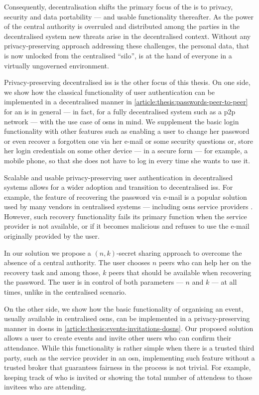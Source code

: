 Consequently, decentralisation shifts the primary focus of the \ac{is} 
to privacy, security and data portability --- and usable functionality thereafter. 
As the power of the central authority is overruled and distributed among the parties 
in the decentralised system new threats arise in the decentralised context. Without 
any privacy-preserving approach addressing these challenges, the personal data, 
that is now unlocked from the centralised ``silo'', is at the hand of everyone in 
a virtually ungoverned environment.

Privacy-preserving decentralised \acp{is} is the other focus of this thesis. On 
one side, we show how the classical functionality of user authentication can be 
implemented in a decentralised manner in \cref{article:thesis:passwords-peer-to-peer} 
for an \ac{is} in general --- in fact, for a fully decentralised system such as 
a \ac{p2p} network --- with the use case of \acp{osn} in mind. We supplement the 
basic login functionality with other features such as enabling a user to change 
her password or even recover a forgotten one via her e-mail or some security questions 
or, store her login credentials on some other device --- in a secure form --- for 
example, a mobile phone, so that she does not have to log in every time she wants 
to use it.

Scalable and usable privacy-preserving user authentication in decentralised systems 
allows for a wider adoption and transition to decentralised \acp{is}. 
For example, the feature of recovering the password via e-mail is a popular solution 
used by many vendors in centralised systems --- including \acp{osn} service providers 
\cite{Kuzma11}. However, such recovery functionality fails its primary function 
when the service provider is not available, or if it becomes malicious and refuses 
to use the e-mail originally provided by the user. 

In our solution we propose a \((n, k)\)-secret sharing approach to overcome the absence 
of a central authority. The user chooses $n$ peers who can help her on the recovery 
task and among those, $k$ peers that should be available when recovering the password. 
The user is in control of both parameters --- $n$ and $k$ ---  at all times, unlike 
in the centralised scenario.

On the other side, we show how the basic functionality of organising an event, usually 
available in centralised \acp{osn}, can be implemented in a privacy-preserving manner 
in \acp{dosn} in \cref{article:thesis:events-invitations-dosns}. Our proposed solution 
allows a user to create events and invite other users who can confirm their attendance. 
While this functionality is rather simple when there is a trusted third party, such as 
the service provider in an \ac{osn}, implementing such feature without a trusted 
broker that guarantees fairness in the process is not trivial. For example, keeping 
track of who is invited or showing the total number of attendess to those invitees 
who are attending.

